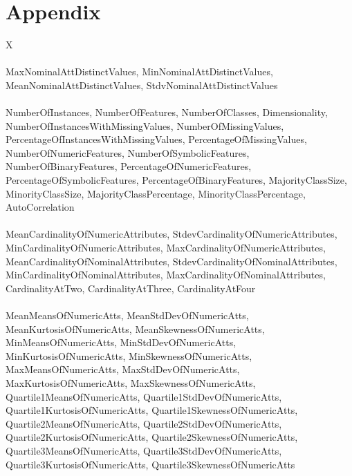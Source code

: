 %
\chapter{Appendix}
\label{sec:appendix}

\begin{table}[h]
\centering
	\begin{tabularx}{\textwidth}{X}
	 \\
	\hline \hline
	 \\ \hline
	MaxNominalAttDistinctValues, MinNominalAttDistinctValues, MeanNominalAttDistinctValues, StdvNominalAttDistinctValues \\ \hline
	 \\ \hline
	NumberOfInstances, NumberOfFeatures, NumberOfClasses, Dimensionality, NumberOfInstancesWithMissingValues, NumberOfMissingValues, PercentageOfInstancesWithMissingValues, PercentageOfMissingValues, NumberOfNumericFeatures, NumberOfSymbolicFeatures, NumberOfBinaryFeatures, PercentageOfNumericFeatures, PercentageOfSymbolicFeatures, PercentageOfBinaryFeatures, MajorityClassSize, MinorityClassSize, MajorityClassPercentage, MinorityClassPercentage, AutoCorrelation \\ \hline
	 \\ \hline
	MeanCardinalityOfNumericAttributes, StdevCardinalityOfNumericAttributes, MinCardinalityOfNumericAttributes, MaxCardinalityOfNumericAttributes, MeanCardinalityOfNominalAttributes, StdevCardinalityOfNominalAttributes, MinCardinalityOfNominalAttributes, MaxCardinalityOfNominalAttributes, CardinalityAtTwo, CardinalityAtThree, CardinalityAtFour \\ \hline
	 \\ \hline
	MeanMeansOfNumericAtts, MeanStdDevOfNumericAtts, MeanKurtosisOfNumericAtts, MeanSkewnessOfNumericAtts, MinMeansOfNumericAtts, MinStdDevOfNumericAtts, MinKurtosisOfNumericAtts, MinSkewnessOfNumericAtts, MaxMeansOfNumericAtts, MaxStdDevOfNumericAtts, MaxKurtosisOfNumericAtts, MaxSkewnessOfNumericAtts, Quartile1MeansOfNumericAtts, Quartile1StdDevOfNumericAtts, Quartile1KurtosisOfNumericAtts, Quartile1SkewnessOfNumericAtts, Quartile2MeansOfNumericAtts, Quartile2StdDevOfNumericAtts, Quartile2KurtosisOfNumericAtts, Quartile2SkewnessOfNumericAtts, Quartile3MeansOfNumericAtts, Quartile3StdDevOfNumericAtts, Quartile3KurtosisOfNumericAtts, Quartile3SkewnessOfNumericAtts \\ \hline

\end{tabularx}
\end{table}
